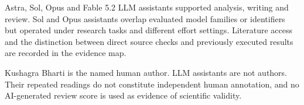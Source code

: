 Astra, Sol, Opus and Fable 5.2 LLM assistants supported analysis, writing and review. Sol and Opus assistants overlap evaluated model families or identifiers but operated under research tasks and different effort settings. Literature access and the distinction between direct source checks and previously executed results are recorded in the evidence map.

Kushagra Bharti is the named human author. LLM assistants are not authors. Their repeated readings do not constitute independent human annotation, and no AI-generated review score is used as evidence of scientific validity.
